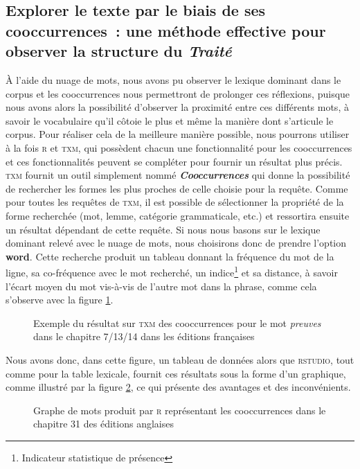 \subsection{Explorer le texte par le biais de ses cooccurrences~: une méthode effective pour observer la structure du \emph{Traité}}
À l'aide du nuage de mots, nous avons pu observer le lexique dominant dans le corpus et les cooccurrences nous permettront de prolonger ces réflexions, puisque nous avons alors la possibilité d'observer la proximité entre ces différents mots, à savoir le vocabulaire qu'il côtoie le plus et même la manière dont s'articule le corpus. Pour réaliser cela de la meilleure manière possible, nous pourrons utiliser à la fois \textsc{r} et \textsc{txm}, qui possèdent chacun une fonctionnalité pour les cooccurrences et ces fonctionnalités peuvent se compléter pour fournir un résultat plus précis. \textsc{txm} fournit un outil simplement nommé \textbf{\textit{Cooccurrences}} qui donne la possibilité de rechercher les formes les plus proches de celle choisie pour la requête. Comme pour toutes les requêtes de \textsc{txm}, il est possible de sélectionner la propriété de la forme recherchée (mot, lemme, catégorie grammaticale, etc.) et ressortira ensuite un résultat dépendant de cette requête. Si nous nous basons sur le lexique dominant relevé avec le nuage de mots, nous choisirons donc de prendre l'option \textbf{word}. Cette recherche produit un tableau donnant la fréquence du mot de la ligne, sa co-fréquence avec le mot recherché, un indice\footnote{Indicateur statistique de présence}  et sa distance, à savoir l'écart moyen du mot vis-à-vis de l'autre mot dans la phrase, comme cela s'observe avec la figure \ref{fig:cooccurrences_preuves}. 
\begin{figure}[p]
    \centering
    \caption{Exemple du résultat sur \textsc{txm} des cooccurrences pour le mot \textit{preuves} dans le chapitre 7/13/14 dans les éditions françaises}
    \label{fig:cooccurrences_preuves}
\end{figure}
Nous avons donc, dans cette figure, un tableau de données alors que \textsc{rstudio}, tout comme pour la table lexicale, fournit ces résultats sous la forme d'un graphique, comme illustré par la figure \ref{fig:graphe_chap31}, ce qui présente des avantages et des inconvénients.
\begin{figure}[p]
    \caption{Graphe de mots produit par \textsc{r} représentant les cooccurrences dans le chapitre 31 des éditions anglaises}
    \label{fig:graphe_chap31}
\end{figure}
